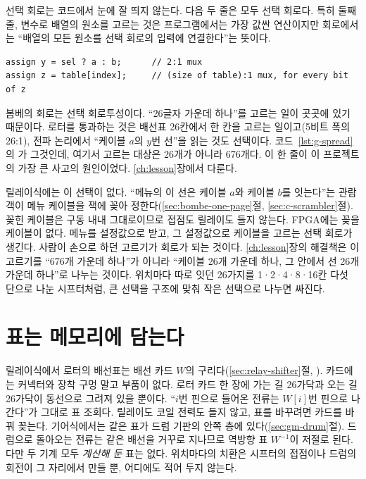 \General 선택 회로는 코드에서 눈에 잘 띄지 않는다. 다음 두 줄은 모두 선택 회로다. 특히 둘째 줄, 변수로
배열의 원소를 고르는 것은 프로그램에서는 가장 값싼 연산이지만 회로에서는 ``배열의 모든 원소를 선택 회로의
입력에 연결한다''는 뜻이다.

\begin{lstlisting}[language=SV,numbers=none]
assign y = sel ? a : b;      // 2:1 mux
assign z = table[index];     // (size of table):1 mux, for every bit of z
\end{lstlisting}

\Ours 봄베의 회로는 선택 회로투성이다. ``26글자 가운데 하나''를 고르는 일이 곳곳에 있기 때문이다.
로터를 통과하는 것은 배선표 26칸에서 한 칸을 고르는 일이고(5비트 폭의 26:1), 전파 논리에서 ``케이블 $a$의
$y$번 선''을 읽는 것도 선택이다. 코드~\ref{lst:g-spread}의 가 그것인데,
여기서 고르는 대상은 26개가 아니라 676개다. 이 한 줄이 이 프로젝트의 가장 큰 사고의 원인이었다.
\ref{ch:lesson}장에서 다룬다.

릴레이식에는 이 선택이 없다. ``메뉴의 이 선은 케이블 $a$와 케이블 $b$를 잇는다''는 관람객이 메뉴 케이블을
잭에 꽂아 정한다(\ref{sec:bombe-one-page}절, \ref{sec:c-scrambler}절). 꽂힌 케이블은 구동 내내 그대로이므로 접점도 릴레이도 들지 않는다.
FPGA에는 꽂을 케이블이 없다. 메뉴를 설정값으로 받고, 그 설정값으로 케이블을 고르는 선택 회로가 생긴다.
사람이 손으로 하던 고르기가 회로가 되는 것이다. \ref{ch:lesson}장의 해결책은 이 고르기를 ``676개 가운데
하나''가 아니라 ``케이블 26개 가운데 하나, 그 안에서 선 26개 가운데 하나''로 나누는 것이다. 위치마다 따로 잇던
26가지를 1·2·4·8·16칸 다섯 단으로 나눈 시프터처럼, 큰 선택을 구조에 맞춰 작은 선택으로 나누면 싸진다.

\section{표는 메모리에 담는다}

\Relay 릴레이식에서 로터의 배선표는 배선 카드 $W$의 구리다(\ref{sec:relay-shifter}절,
). 카드에는 커넥터와 장착 구멍 말고 부품이 없다. 로터 카드 한 장에 가는 길
26가닥과 오는 길 26가닥이 동선으로 그려져 있을 뿐이다. ``$i$번 핀으로 들어온 전류는 $W[i]$번 핀으로 나간다''가
그대로 표 조회다. 릴레이도 코일 전력도 들지 않고, 표를 바꾸려면 카드를 바꿔 꽂는다. 기어식에서는 같은 표가
드럼 기판의 안쪽 층에 있다(\ref{sec:gm-drum}절). 드럼으로 돌아오는 전류는 같은 배선을 거꾸로 지나므로
역방향 표 $W^{-1}$이 저절로 된다. 다만 두 기계 모두 \emph{계산해 둔} 표는 없다. 위치마다의 치환은 시프터의
접점이나 드럼의 회전이 그 자리에서 만들 뿐, 어디에도 적어 두지 않는다.

